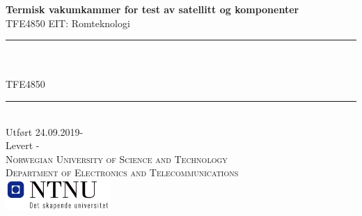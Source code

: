 \newcommand{\HRule}{\rule{\linewidth}{0.5mm}}



\begin{titlepage}
\begin{center}

\textbf{\LARGE Termisk vakumkammer for test av satellitt og komponenter} \\[1.5cm]
\textmd{\LARGE TFE4850 EIT: Romteknologi}\\[1.5cm]

\HRule \\[1cm]

\textmd{\Large } \\[0.5cm]
\textmd{\large TFE4850} \\[1cm]

\HRule \\[1cm]

\large{Utført 24.09.2019-}\\
\large{Levert -}\\[6cm]
\textsc{\large Norwegian University of Science and Technology \\
			Department of Electronics and Telecommunications} \\[1 cm]
			\includegraphics[width=0.3\textwidth]{img/NTNU.png}
\end{center}
\end{titlepage}
